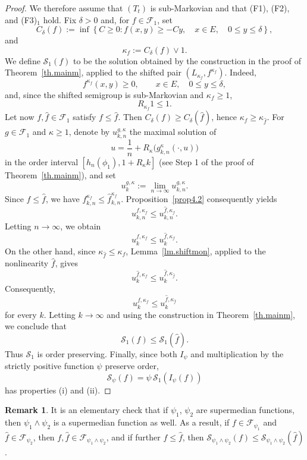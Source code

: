 \documentclass[11pt,a4paper,reqno]{amsart}
\theoremstyle{definition}
\newtheorem{remark}[theorem]{Remark}
\numberwithin{equation}{section}
\begin{document}
\begin{proof}
We therefore assume that $(T_t)$ is sub-Markovian and that
\textup{(F1)}, \textup{(F2)}, and \textup{(F3)}$_1$ hold.
Fix $\delta>0$ and, for $f\in\mathscr F_1$, set
\[
C_\delta(f)
:=
\inf\left\{
C\ge0:
f(x,y)\ge-Cy,\quad x\in E,\quad 0\le y\le\delta
\right\},
\]
and
\[
\kappa_f:=C_\delta(f)\vee1.
\]
We define $\mathcal S_1(f)$ to be the solution obtained by the
construction in the proof of Theorem~\ref{th.mainm}, applied to the
shifted pair $(L_{\kappa_f},f^{\kappa_f})$. Indeed,
\[
f^{\kappa_f}(x,y)\ge0,
\qquad x\in E,\quad 0\le y\le\delta,
\]
and, since the shifted semigroup is sub-Markovian and
$\kappa_f\ge1$,
\[
R_{\kappa_f}1\le1.
\]
Let now $f,\hat f\in\mathscr F_1$ satisfy $f\le\hat f$. Then $C_\delta(f)\ge C_\delta(\hat f)$, hence $\kappa_f\ge\kappa_{\hat f}$.
For  $g\in \mathscr F_1$ and $\kappa\ge 1$, denote by
$u_{k,n}^{g,\kappa}$ the maximal solution of 
\[
u=\frac1n+
R_{\kappa}
\bigl(g_{k,n}^{\kappa}(\cdot,u)\bigr)
\]
in the order interval $[h_n(\phi_1),1+R_\kappa k]$ (see Step 1 of the proof of Theorem~\ref{th.mainm}),
and set
\[
u_k^{g,\kappa}:=\lim_{n\to\infty}u_{k,n}^{g,\kappa}.
\]
Since $f\le\hat f$, we have $f_{k,n}^{\kappa_f}\le\hat f_{k,n}^{\kappa_f}$.
Proposition~\ref{prop4.2} consequently yields
\[
u_{k,n}^{f,\kappa_f}
\le
u_{k,n}^{\hat f,\kappa_f}.
\]
Letting $n\to\infty$, we obtain
\[
u_k^{f,\kappa_f}
\le
u_k^{\hat f,\kappa_f}.
\]
On the other hand, since $\kappa_{\hat f}\le\kappa_f$,
Lemma~\ref{lm.shiftmon}, applied to the nonlinearity $\hat f$, gives
\[
u_k^{\hat f,\kappa_f}
\le
u_k^{\hat f,\kappa_{\hat f}}.
\]
Consequently,
\[
u_k^{f,\kappa_f}
\le
u_k^{\hat f,\kappa_{\hat f}}
\]
for every $k$. Letting $k\to\infty$ and using the construction in
Theorem~\ref{th.mainm}, we conclude that
\[
\mathcal S_1(f)\le\mathcal S_1(\hat f).
\]
Thus $\mathcal S_1$ is order preserving.
Finally, since both $I_\psi$ and multiplication by the strictly
positive function $\psi$ preserve order,
\[
\mathcal S_\psi(f)
=
\psi\,\mathcal S_1(I_\psi(f))
\]
has properties \textup{(i)} and \textup{(ii)}.
\end{proof}




\begin{remark}
It is an elementary check that if $\psi_1$, $\psi_2$ are supermedian functions, then $\psi_1\wedge\psi_2$
is a supermedian function as well. As a result, if $f\in\mathscr F_{\psi_1}$ and $\hat f\in \mathscr F_{\psi_2}$, then
$f,\hat f\in \mathscr F_{\psi_1\wedge\psi_2}$, and if further $f\le\hat f$, then 
$\mathcal S_{\psi_1\wedge\psi_2}(f)\le \mathcal S_{\psi_1\wedge\psi_2}(\hat f)$.
\end{remark}
\end{document}
